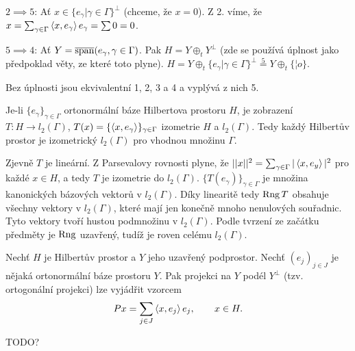 \documentclass[12pt]{article}					%
\begin{document}
\begin{veta}
\begin{dukazin}
		$2 \implies 5$: Ať $x \in \{e_\gamma | \gamma \in \Gamma\}^{\perp}$ (chceme, že $x = 0$). Z 2. víme, že $x = \sum_{\gamma \in \Gamma}\left\langle x, e_\gamma\right\rangle e_\gamma = \sum 0 = 0$.

		$5 \implies 4$: Ať $Y = \overline{\operatorname{span}}(e_\gamma, \gamma \in \Gamma)$. Pak $H = Y \oplus_t Y^{\perp}$ (zde se používá úplnost jako předpoklad věty, ze které toto plyne). $H = Y \oplus_t \{e_\gamma | \gamma \in \Gamma\}^\perp \overset{5}{=} Y \oplus_t \{¦o\}$.
	\end{dukazin}

	\begin{poznamka}
		Bez úplnosti jsou ekvivalentní 1, 2, 3 a 4 a vyplývá z nich 5.
	\end{poznamka}
\end{veta}


\begin{veta}
	Je-li $\{e_\gamma\}_{\gamma \in \Gamma}$ ortonormální báze Hilbertova prostoru $H$, je zobrazení $T: H \rightarrow l_2(\Gamma)$, $T(x) = \{\left\langle x, e_\gamma\right\rangle\}_{\gamma \in \Gamma}$ izometrie $H$ a $l_2(\Gamma)$. Tedy každý Hilbertův prostor je izometrický $l_2(\Gamma)$ pro vhodnou množinu $\Gamma$.

	\begin{dukazin}[Ze skript]
		Zjevně $T$ je lineární. Z Parsevalovy rovnosti plyne, že $||x||^2 = \sum_{\gamma \in \Gamma} |\left\langle x, e_y\right\rangle|^2$ pro každé $x \in H$, a tedy $T$ je izometrie do $l_2(\Gamma)$. $\{T(e_\gamma)\}_{\gamma \in \Gamma}$ je množina kanonických bázových vektorů v $l_2(\Gamma)$. Díky linearitě tedy $\operatorname{Rng} T$ obsahuje všechny vektory v $l_2(\Gamma)$, které mají jen konečně mnoho nenulových souřadnic. Tyto vektory tvoří hustou podmnožinu v $l_2(\Gamma)$. Podle tvrzení ze začátku předměty je $\operatorname{Rng}$ uzavřený, tudíž je roven celému $l_2(\Gamma)$.
	\end{dukazin}
\end{veta}

\begin{veta}
	Nechť $H$ je Hilbertův prostor a $Y$ jeho uzavřený podprostor. Nechť $(e_j)_{j \in J}$ je nějaká ortonormální báze prostoru $Y$. Pak projekci na $Y$ podél $Y^\perp$ (tzv. ortogonální projekci) lze vyjádřit vzorcem
	$$ Px = \sum_{j \in J}\left\langle x, e_j\right\rangle e_j, \qquad x \in H. $$

	\begin{dukazin}
		TODO?
	\end{dukazin}
\end{veta}
\end{document}
